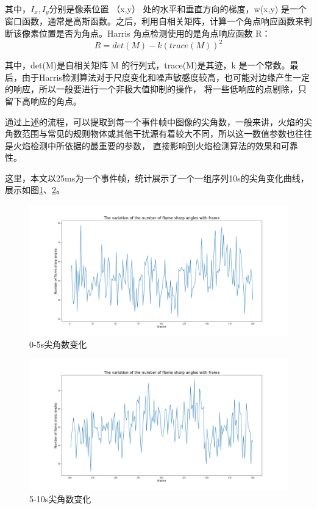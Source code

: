 其中，$I_x,I_y$分别是像素位置 （x,y） 处的水平和垂直方向的梯度，w(x,y) 是一个窗口函数，通常是高斯函数。之后，利用自相关矩阵，计算一个角点响应函数来判断该像素位置是否为角点。Harris 角点检测使用的是角点响应函数 
R：
\begin{equation} 
    R=det(M)-k(trace(M))^2
\end{equation}

其中，det(M)是自相关矩阵 M 的行列式，trace(M)是其迹，k 是一个常数。最后，由于Harris检测算法对于尺度变化和噪声敏感度较高，也可能对边缘产生一定的响应，所以一般要进行一个非极大值抑制的操作，
将一些低响应的点剔除，只留下高响应的角点。

通过上述的流程，可以提取到每一个事件帧中图像的尖角数，一般来讲，火焰的尖角数范围与常见的规则物体或其他干扰源有着较大不同，所以这一数值参数也往往是火焰检测中所依据的最重要的参数，
直接影响到火焰检测算法的效果和可靠性。

这里，本文以25ms为一个事件帧，统计展示了一个一组序列10s的尖角变化曲线，展示如图\ref{6}、\ref{7}。
\begin{figure}[ht]
    \centering
    \includegraphics[width=\textwidth]{figures/extract_tip_01.png}
    \caption{0-5s尖角数变化}
    \label{6}
    \end{figure}

\begin{figure}[ht]
    \centering
    \includegraphics[width=\textwidth]{figures/extract_tip_02.png}
    \caption{5-10s尖角数变化}
    \label{7}
    \end{figure}

